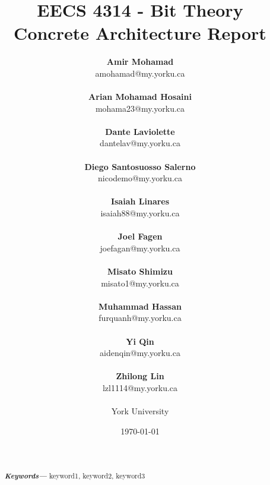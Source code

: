 \documentclass[12pt, dvipsnames, a4paper]{article}
\providecommand{\keywords}[1]
{
  \small	
  \textbf{\textit{Keywords---}} #1
}
\begin{document}
\title{\textbf{EECS 4314 - Bit Theory\\Concrete Architecture Report}}
\date{\Large \today}
\author{
	\large \textbf{Amir Mohamad}\\ \small amohamad@my.yorku.ca\\\\
	\large \textbf{Arian Mohamad Hosaini}\\ \small mohama23@my.yorku.ca\\\\
	\large \textbf{Dante Laviolette}\\ \small dantelav@my.yorku.ca\\\\
	\large \textbf{Diego Santosuosso Salerno}\\ \small nicodemo@my.yorku.ca\\\\
	\large \textbf{Isaiah Linares}\\ \small isaiah88@my.yorku.ca\\\\
	\large \textbf{Joel Fagen}\\ \small joefagan@my.yorku.ca\\\\
	\large \textbf{Misato Shimizu}\\ \small misato1@my.yorku.ca\\\\
	\large \textbf{Muhammad Hassan}\\ \small furquanh@my.yorku.ca\\\\
	\large \textbf{Yi Qin}\\ \small aidenqin@my.yorku.ca\\\\
	\large \textbf{Zhilong Lin}\\ \small lzl1114@my.yorku.ca\\\\
	\large York University\\
}
\maketitle
\newpage
\hspace{0pt}
\vfill
\begin{abstract}
	\lipsum[1]
	\lipsum[1]
	\\\\
	\keywords{keyword1, keyword2, keyword3}
\end{abstract}
\vfill
\hspace{0pt}
\newpage
\tableofcontents
\clearpage
\end{document}
